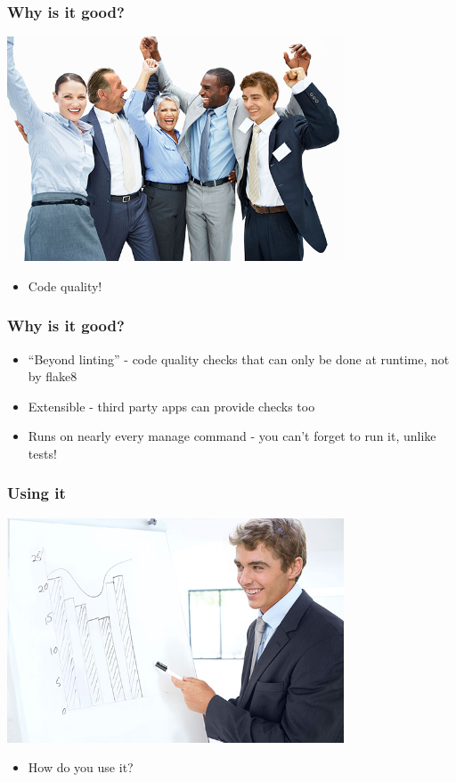 \documentclass{beamer}
\begin{document}
\begin{frame}[fragile]\frametitle{Why is it good?}

    \begin{center}
        \includegraphics[width=10cm]{celebrate}
    \end{center}

    \begin{itemize}
        \item Code quality!
    \end{itemize}

\end{frame}


\begin{frame}[fragile]\frametitle{Why is it good?}

    \begin{itemize}
        \item ``Beyond linting'' - code quality checks that can only be done at runtime, not by flake8
        \item Extensible - third party apps can provide checks too
        \item Runs on nearly every manage command - you can't forget to run it, unlike tests!
    \end{itemize}

\end{frame}


\begin{frame}[fragile]\frametitle{Using it}

    \begin{center}
        \includegraphics[width=10cm]{demo}
    \end{center}

    \begin{itemize}
        \item How do you use it?
    \end{itemize}

\end{frame}
\end{document}

